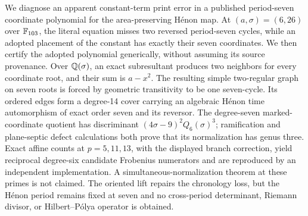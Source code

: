 We diagnose an apparent constant-term print error in a published period-seven
coordinate polynomial for the area-preserving H\'enon map.  At
$(a,\sigma)=(6,26)$ over $\mathbb F_{103}$, the literal equation misses two reversed
period-seven cycles, while an adopted placement of the constant has exactly
their seven coordinates.  We then certify the adopted polynomial generically,
without assuming its source provenance.  Over $\mathbb Q(\sigma)$, an exact
subresultant produces two neighbors for every coordinate root, and their sum
is $a-x^2$.  The resulting simple two-regular graph on seven roots is forced
by geometric transitivity to be one seven-cycle.  Its ordered edges form a
degree-14 cover carrying an algebraic H\'enon time automorphism of exact order
seven and its reversor.  The degree-seven marked-coordinate quotient has
discriminant $(4\sigma-9)^2Q_6(\sigma)^3$; ramification and plane-septic
defect calculations both prove that its normalization has genus three.
Exact affine counts at $p=5,11,13$, with the displayed branch correction,
yield reciprocal degree-six candidate Frobenius numerators and are reproduced
by an independent implementation.  A simultaneous-normalization theorem at
these primes is not claimed.  The oriented lift repairs the chronology loss,
but the H\'enon period remains fixed at seven and no cross-period determinant,
Riemann divisor, or Hilbert--P\'olya operator is obtained.
